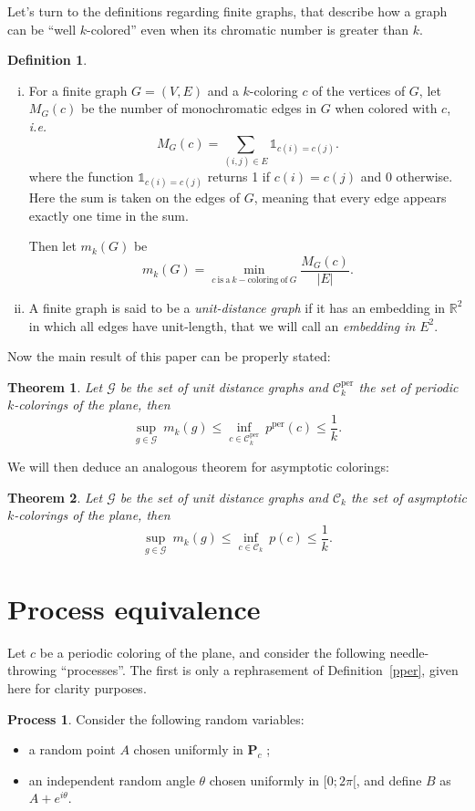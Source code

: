 \documentclass[a4paper,11pt]{article}
\newtheorem{theo}{Theorem}
\theoremstyle{definition}
\newtheorem{definition}{Definition}
\newtheorem{process}{Process}
\theoremstyle{remark}
\newcommand{\R}{\mathbb{R}}
\newcommand{\C}{\mathcal{C}}
\renewcommand{\P}{\mathbf{P}}
\newcommand{\pper}{p^{\mathrm{per}}}
\newcommand{\Cp}{\mathcal{C}^{\mathrm{per}}}
\begin{document}
Let's turn to the definitions regarding finite graphs, that describe how a graph
can be ``well $k$-colored'' even when its chromatic number is greater
than $k$.
\begin{definition}
\ 
\begin{enumerate}[i)]
\item For a finite graph $G=(V,E)$ and a $k$-coloring $c$ of the vertices of $G$, 
let $M_G(c)$ be the number of monochromatic edges in $G$ when colored with $c$, \textit{i.e.}
$$M_G(c) = \sum_{(i, j) \in E} \mathds{1}_{c(i)=c(j)}.$$
where the function $\mathds{1}_{c(i)=c(j)}$ returns 1 if $c(i)=c(j)$ and 0 otherwise. Here the sum is taken on the edges of $G$, meaning that every edge appears exactly one time in the sum.

Then let $m_k(G)$ be
\[m_k(G) = \min_{c \ \mathrm{is \ a} \ k-\mathrm{coloring \ of} \ G} \frac{M_G(c)}{|E|}.\]
\item A finite graph is said to be a \emph{unit-distance graph} if it has 
an embedding in $\R^2$ in which all edges have unit-length, that we will call an \textit{embedding in} $E^2$.
\end{enumerate}
\end{definition}
Now the main result of this paper can be properly stated:
\begin{theo} \label{ineg}
Let $\mathcal{G}$ be the set of unit distance graphs and $\Cp_k$ the set 
of periodic $k$-colorings of the plane, then
$$ \sup_{g \in \mathcal{G}} \ m_k(g) \leq \inf_{c \in \Cp_k} \ \pper(c) \leq \frac{1}{k}. $$
\end{theo}
We will then deduce an analogous theorem for asymptotic 
colorings:
\begin{theo} \label{ineg2}
Let $\mathcal{G}$ be the set of unit distance graphs and $\C_k$ the set 
of asymptotic $k$-colorings of the plane, then
$$ \sup_{g \in \mathcal{G}} \ m_k(g) \leq \inf_{c \in \C_k} \ p(c) \leq \frac{1}{k}. $$
\end{theo}

\section{Process equivalence}
\label{equiv}

Let $c$ be a periodic coloring of the plane, and consider the following needle-throwing ``processes''. The first is only a rephrasement of Definition~\ref{pper}, given here for clarity purposes.
\begin{process} \label{premier}
Consider the following random variables:
\begin{itemize}
  \item a random point $A$ chosen uniformly 
  in $\P_c$ ;
  \item an independent random angle $\theta$ chosen uniformly in $[0;2 \pi[$, and define $B$ as $A + e^{i \theta}$.
\end{itemize}
\end{process}
\end{document}
